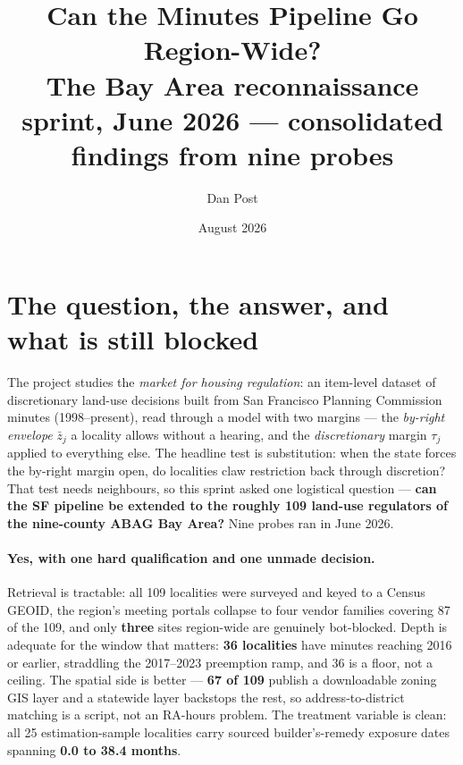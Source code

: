 \documentclass[11pt]{article}
\title{Can the Minutes Pipeline Go Region-Wide?\\
\large The Bay Area reconnaissance sprint, June 2026 --- consolidated findings from nine probes}
\author{Dan Post}
\date{August 2026}
\begin{document}
\maketitle

\begin{center}
\end{center}

\section{The question, the answer, and what is still blocked}

The project studies the \emph{market for housing regulation}: an item-level dataset of
discretionary land-use decisions built from San Francisco Planning Commission minutes
(1998--present), read through a model with two margins --- the \emph{by-right envelope}
$\bar z_j$ a locality allows without a hearing, and the \emph{discretionary} margin $\tau_j$
applied to everything else. The headline test is substitution: when the state forces the by-right
margin open, do localities claw restriction back through discretion? That test needs neighbours,
so this sprint asked one logistical question --- \textbf{can the SF pipeline be extended to the
roughly 109 land-use regulators of the nine-county ABAG Bay Area?} Nine probes ran in June 2026.

\paragraph{Yes, with one hard qualification and one unmade decision.} Retrieval is tractable: all
109 localities were surveyed and keyed to a Census GEOID, the region's meeting portals collapse
to four vendor families covering 87 of the 109, and only \textbf{three} sites region-wide are
genuinely bot-blocked. Depth is adequate for the window that matters: \textbf{36 localities} have
minutes reaching 2016 or earlier, straddling the 2017--2023 preemption ramp, and 36 is a floor,
not a ceiling. The spatial side is better --- \textbf{67 of 109} publish a downloadable zoning
GIS layer and a statewide layer backstops the rest, so address-to-district matching is a script,
not an RA-hours problem. The treatment variable is clean: all 25 estimation-sample localities
carry sourced builder's-remedy exposure dates spanning \textbf{0.0 to 38.4 months}.
\end{document}

